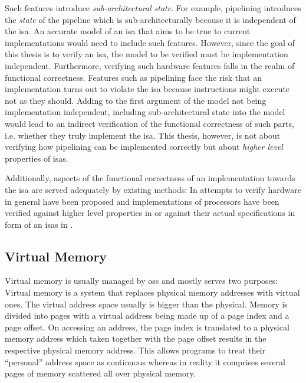 Such features introduce \textit{sub-architectural state}.
For example, pipelining introduces the \textit{state} of the pipeline which is sub-architecturally because it is independent of the \gls{isa}.
An accurate model of an \gls{isa} that aims to be true to current implementations would need to include such features.
However, since the goal of this thesis is to verify an \gls{isa}, the model to be verified must be implementation independent.
Furthermore, verifying such hardware features falls in the realm of functional correctness.
Features such as pipelining face the risk that an implementation turns out to violate the \gls{isa} because instructions might execute not as they should.
Adding to the first argument of the model not being implementation independent, including sub-architectural state into the model would lead to an indirect verification of the functional correctness of such parts, i.e. whether they truly implement the \gls{isa}.
This thesis, however, is not about verifying how pipelining can be implemented correctly but about \textit{higher level} properties of \glspl{isa}.

Additionally, aspects of the functional correctness of an implementation towards the \gls{isa} are served adequately by existing methods:
In \cite{Mukherjee16} attempts to verify hardware in general have been proposed and implementations of processors have been verified against higher level properties in \cite{Zhang15, Beatty94, Berezin98, Trippel19} or against their actual specifications in form of an \glspl{isa} in \cite{Burch94, Reid16, RISCV-formal}.

\subsection{Virtual Memory}
\label{sec:virtual-memory}

Virtual memory is usually managed by \glspl{os} and mostly serves two purposes: 
Virtual memory is a system that replaces physical memory addresses with virtual ones.
The virtual address space usually is bigger than the physical.
Memory is divided into pages with a virtual address being made up of a page index and a page offset.
On accessing an address, the page index is translated to a physical memory address which taken together with the page offset results in the respective physical memory address.
This allows programs to treat their \enquote{personal} address space as continuous whereas in reality it comprises several pages of memory scattered all over physical memory.

